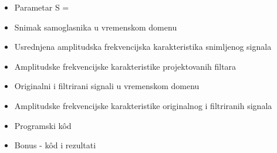 
\begin{itemize}
    \item Parametar S = 
    \item Snimak samoglasnika u vremenskom domenu
    \item Usrednjena amplitudska frekvencijska karakteristika snimljenog signala
    \item Amplitudske frekvencijske karakteristike projektovanih filtara
    \item Originalni i filtrirani signali u vremenskom domenu
     \item Amplitudske frekvencijske karakteristike originalnog i filtriranih signala
    \item Programski k\^{o}d 
    \item Bonus - k\^{o}d i rezultati
\end{itemize}